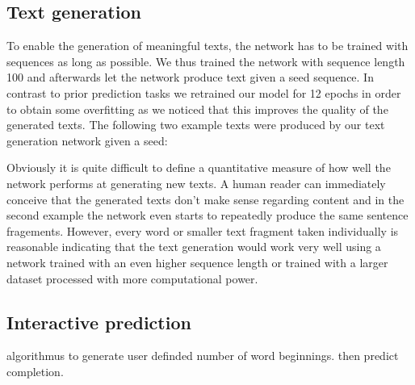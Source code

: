 \documentclass[11pt,a4paper,bibliography=totocnumbered,listof=totocnumbered]{scrartcl}
\begin{document}
\subsection{Text generation} \label{ssec:tg}
To enable the generation of meaningful texts, the network has to be trained with sequences as long as possible. We thus trained the network with sequence length 100 and afterwards let the network produce text given a seed sequence. In contrast to prior prediction tasks we retrained our model for 12 epochs in order to obtain some overfitting as we noticed that this improves the quality of the generated texts. 
The following two example texts were produced by our text generation network given a seed:




Obviously it is quite difficult to define a quantitative measure of how well the network performs at generating new texts. A human reader can immediately conceive that the generated texts don't make sense regarding content and in the second example the network even starts to repeatedly produce the same sentence fragements. However, every word or smaller text fragment taken individually is reasonable indicating that the text generation would work very well using a network trained with an even higher sequence length or trained with a larger dataset processed with more computational power.


\subsection{Interactive prediction}
algorithmus to generate user definded number of word beginnings. then predict completion.
\end{document}
